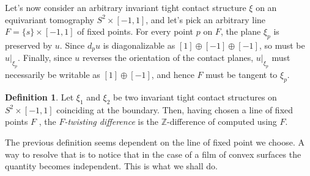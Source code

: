 \documentclass[a4paper, 11pt]{amsart}
\theoremstyle{plain}
\theoremstyle{definition}
\newtheorem{defin}[defin]{Definition}
\newcommand{\Z}{\mathbb{Z}}
\begin{document}
Let's now consider an arbitrary invariant tight contact structure $\xi$ on an equivariant tomography $S^2 \times [-1,1]$, and let's pick an arbitrary line $F = \{s\} \times [-1,1]$ of fixed points. For every point $p$ on $F$, the plane $\xi_p$ is preserved by $u$. Since $d_pu$ is diagonalizable as $[1] \oplus [-1] \oplus [-1]$, so must be $u|_{\xi_p}$. Finally, since $u$ reverses the orientation of the contact planes, $u|_{\xi_p}$ must necessarily be writable as $[1]\oplus [-1]$, and hence $F$ must be tangent to $\xi_p$.
\begin{defin}\label{twdif}
	Let $\xi_1$ and $\xi_2$ be two invariant tight contact structures on $S^2 \times [-1,1]$ coinciding at the boundary. Then, having chosen a line of fixed points $F$ , the \emph{$F$-twisting difference} is the $\Z$-difference of  computed using $F$.
\end{defin}
The previous definition seems dependent on the line of fixed point we choose. A way to resolve that is to notice that in the case of a film of convex surfaces the quantity becomes independent. This is what we shall do.
\end{document}
